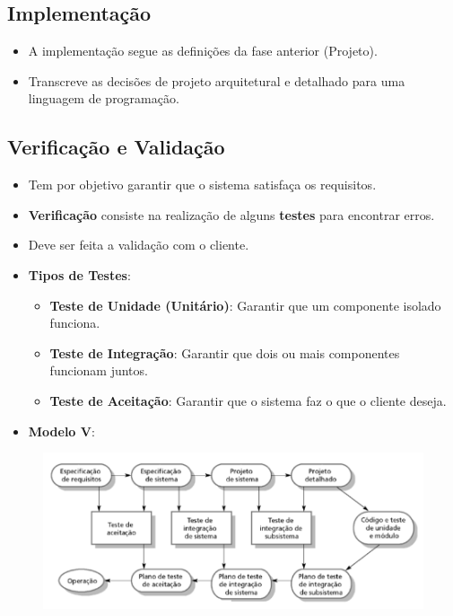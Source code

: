 \documentclass[a4paper, 11pt]{article}
\begin{document}
\subsection{Implementação}
\begin{itemize}
	\item A implementação segue as definições da fase anterior (Projeto).
	\item Transcreve as decisões de projeto arquitetural e detalhado para uma linguagem de programação.
\end{itemize}

\subsection{Verificação e Validação}
\begin{itemize}
	\item Tem por objetivo garantir que o sistema satisfaça os requisitos.
	\item \textbf{Verificação} consiste na realização de alguns \textbf{testes} para encontrar erros.
	\item Deve ser feita a validação com o cliente.
	\item \textbf{Tipos de Testes}:
	\begin{itemize}
		\item \textbf{Teste de Unidade (Unitário)}: Garantir que um componente isolado funciona.
		\item \textbf{Teste de Integração}: Garantir que dois ou mais componentes funcionam juntos.
		\item \textbf{Teste de Aceitação}: Garantir que o sistema faz o que o cliente deseja.
	\end{itemize}
	\item \textbf{Modelo V}:
\end{itemize}

\begin{figure}[h]
	\includegraphics[width=15cm]{modelo_processo_software}
	\centering
\end{figure}
\end{document}
